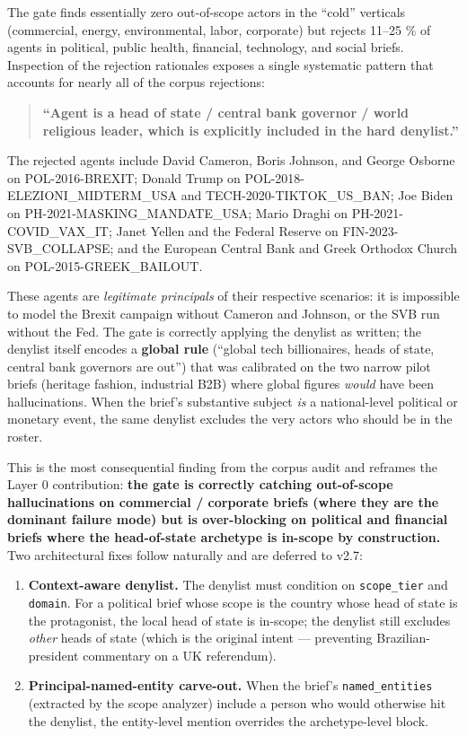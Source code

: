 \documentclass[
]{article}
\providecommand{\tightlist}{%
  \setlength{\itemsep}{0pt}\setlength{\parskip}{0pt}}
\begin{document}
The gate finds essentially zero out-of-scope actors in the ``cold''
verticals (commercial, energy, environmental, labor, corporate) but
rejects 11--25 \% of agents in political, public health, financial,
technology, and social briefs. Inspection of the rejection rationales
exposes a single systematic pattern that accounts for nearly all of the
corpus rejections:

\begin{quote}
\textbf{``Agent is a head of state / central bank governor / world
religious leader, which is explicitly included in the hard denylist.''}
\end{quote}

The rejected agents include David Cameron, Boris Johnson, and George
Osborne on POL-2016-BREXIT; Donald Trump on
POL-2018-ELEZIONI\_MIDTERM\_USA and TECH-2020-TIKTOK\_US\_BAN; Joe Biden
on PH-2021-MASKING\_MANDATE\_USA; Mario Draghi on
PH-2021-COVID\_VAX\_IT; Janet Yellen and the Federal Reserve on
FIN-2023-SVB\_COLLAPSE; and the European Central Bank and Greek Orthodox
Church on POL-2015-GREEK\_BAILOUT.

These agents are \emph{legitimate principals} of their respective
scenarios: it is impossible to model the Brexit campaign without Cameron
and Johnson, or the SVB run without the Fed. The gate is correctly
applying the denylist as written; the denylist itself encodes a
\textbf{global rule} (``global tech billionaires, heads of state,
central bank governors are out'') that was calibrated on the two narrow
pilot briefs (heritage fashion, industrial B2B) where global figures
\emph{would} have been hallucinations. When the brief's substantive
subject \emph{is} a national-level political or monetary event, the same
denylist excludes the very actors who should be in the roster.

This is the most consequential finding from the corpus audit and
reframes the Layer 0 contribution: \textbf{the gate is correctly
catching out-of-scope hallucinations on commercial / corporate briefs
(where they are the dominant failure mode) but is over-blocking on
political and financial briefs where the head-of-state archetype is
in-scope by construction.} Two architectural fixes follow naturally and
are deferred to v2.7:

\begin{enumerate}
\def\labelenumi{\arabic{enumi}.}
\tightlist
\item
  \textbf{Context-aware denylist.} The denylist must condition on
  \texttt{scope\_tier} and \texttt{domain}. For a political brief whose
  scope is the country whose head of state is the protagonist, the local
  head of state is in-scope; the denylist still excludes \emph{other}
  heads of state (which is the original intent --- preventing
  Brazilian-president commentary on a UK referendum).
\item
  \textbf{Principal-named-entity carve-out.} When the brief's
  \texttt{named\_entities} (extracted by the scope analyzer) include a
  person who would otherwise hit the denylist, the entity-level mention
  overrides the archetype-level block.
\end{enumerate}
\end{document}
